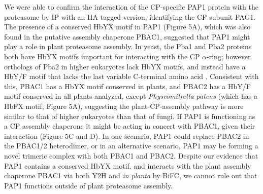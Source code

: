 We were able to confirm the interaction of the CP-specific PAP1 protein with the proteasome by IP with an HA tagged version, identifying the CP subunit PAG1. The presence of a conserved HbYX motif in PAP1 (Figure 5A), which was also found in the putative assembly chaperone PBAC1, suggested that PAP1 might play a role in plant proteasome assembly. In yeast, the Pba1 and Pba2 proteins both have HbYX motifs important for interacting with the CP $\alpha$-ring; however orthologs of Pba2 in higher eukaryotes lack HbYX motifs, and instead have a HbY/F motif that lacks the last variable C-terminal amino  acid \citep{kusmierczyk11}. Consistent with this, PBAC1 has a HbYX motif conserved in plants, and PBAC2 has a HbY/F motif conserved in all plants analyzed, except \textit{Physcomitrella patens} (which has a HbFX motif, Figure 5A), suggesting the plant-CP-assembly pathway is more similar to that of higher eukaryotes than that of fungi. If PAP1 is functioning as a CP assembly chaperone it might be acting in concert with PBAC1, given their interaction (Figure 5C and D). In one scenario, PAP1 could replace PBAC2 in the PBAC1/2 heterodimer, or in an alternative scenario, PAP1 may be forming a novel trimeric complex with both PBAC1 and PBAC2. Despite our evidence that PAP1 contains a conserved HbYX motif, and interacts with the plant assembly chaperone PBAC1 via both Y2H and \textit{in planta} by BiFC, we cannot rule out that PAP1 functions outside of plant proteasome assembly.

